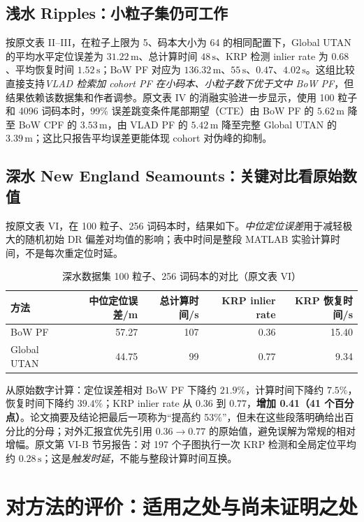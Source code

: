 \documentclass[11pt]{article}
\begin{document}
\subsection{浅水 Ripples：小粒子集仍可工作}

按原文表 II--III，在粒子上限为 5、码本大小为 64 的相同配置下，Global UTAN 的平均水平定位误差为 $31.22\,\mathrm m$、总计算时间 $48\,\mathrm s$、KRP 检测 inlier rate 为 $0.68$、平均恢复时间 $1.52\,\mathrm s$；BoW PF 对应为 $136.32\,\mathrm m$、$55\,\mathrm s$、$0.47$、$4.02\,\mathrm s$。这组比较直接支持\emph{VLAD 检索加 cohort PF 在小码本、小粒子数下优于文中 BoW PF}，但结果依赖该数据集和作者调参。原文表 IV 的消融实验进一步显示，使用 100 粒子和 4096 词码本时，99\% 误差跳变条件尾部期望（CTE）由 BoW PF 的 $5.62\,\mathrm m$ 降至 BoW CPF 的 $3.53\,\mathrm m$，由 VLAD PF 的 $5.42\,\mathrm m$ 降至完整 Global UTAN 的 $3.39\,\mathrm m$；这比只报告平均误差更能体现 cohort 对伪峰的抑制。

\subsection{深水 New England Seamounts：关键对比看原始数值}

按原文表 VI，在 100 粒子、256 词码本时，结果如下。\emph{中位定位误差}用于减轻极大的随机初始 DR 偏差对均值的影响；表中时间是整段 MATLAB 实验计算时间，不是每次重定位时延。

\begin{table}[htbp]
\centering\small
\caption{深水数据集 100 粒子、256 词码本的对比（原文表 VI）}
\begin{tabular}{lrrrr}
\toprule
方法 & 中位定位误差/m & 总计算时间/s & KRP inlier rate & KRP 恢复时间/s\\
\midrule
BoW PF & 57.27 & 107 & 0.36 & 15.40\\
Global UTAN & 44.75 & 99 & 0.77 & 9.34\\
\bottomrule
\end{tabular}
\end{table}

从原始数字计算：定位误差相对 BoW PF 下降约 $21.9\%$，计算时间下降约 $7.5\%$，恢复时间下降约 $39.4\%$；KRP inlier rate 从 $0.36$ 到 $0.77$，\textbf{增加 0.41（41 个百分点）}。论文摘要及结论把最后一项称为“提高约 53\%”，但未在这些段落明确给出百分比的分母；对外汇报宜优先引用 $0.36\rightarrow0.77$ 的原始值，避免误解为常规的相对增幅。原文第 VI-B 节另报告：对 197 个子图执行一次 KRP 检测和全局定位平均约 $0.28\,\mathrm s$；这是\emph{触发时延}，不能与整段计算时间互换。

\section{对方法的评价：适用之处与尚未证明之处}
\end{document}
